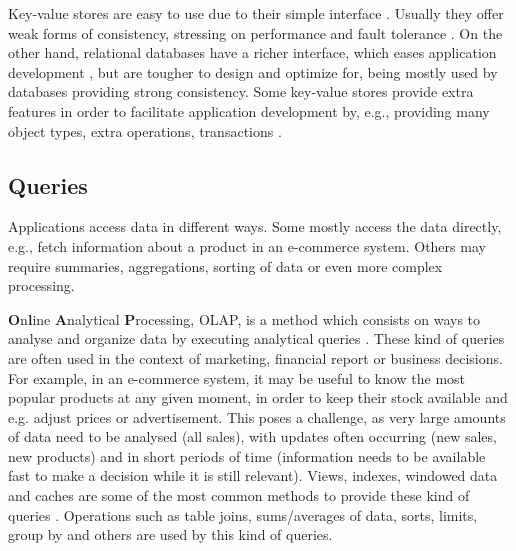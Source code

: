 Key-value stores are easy to use due to their simple interface \cite{dynamo}. 
Usually they offer weak forms of consistency, stressing on performance and fault tolerance \cite{dynamo, cops, cure}.
On the other hand, relational databases have a richer interface, which eases application development \cite{spanner, noria, eiger}, but are tougher to design and optimize for, being mostly used by databases providing strong consistency.
Some key-value stores provide extra features in order to facilitate application development by, e.g., providing many object types, extra operations, transactions \cite{cure, walter}.

\subsection{Queries}


Applications access data in different ways.
Some mostly access the data directly, e.g., fetch information about a product in an e-commerce system.
Others may require summaries, aggregations, sorting of data or even more complex processing.

\textbf{O}n\textbf{l}ine \textbf{A}nalytical \textbf{P}rocessing, OLAP, is a method which consists on ways to analyse and organize data by executing analytical queries \cite{dbtoaster, viewSelection, optIncMaintenance, effMaintenance}.
These kind of queries are often used in the context of marketing, financial report or business decisions.
For example, in an e-commerce system, it may be useful to know the most popular products at any given moment, in order to keep their stock available and e.g. adjust prices or advertisement.
This poses a challenge, as very large amounts of data need to be analysed (all sales), with updates often occurring (new sales, new products) and in short periods of time (information needs to be available fast to make a decision while it is still relevant).
Views, indexes, windowed data and caches are some of the most common methods to provide these kind of queries \cite{noria, dbtoaster, pequod, txcache, viewSelection, optIncMaintenance, effMaintenance}.
Operations such as table joins, sums/averages of data, sorts, limits, group by and others are used by this kind of queries. 

